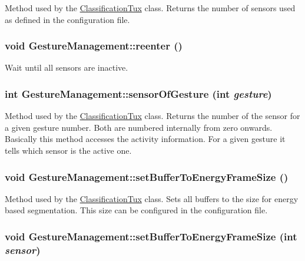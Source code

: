 \label{classGestureManagement_a97421724eb23c9b576a731ab084410da}
Method used by the \hyperlink{classClassificationTux}{ClassificationTux} class. Returns the number of sensors used as defined in the configuration file. \hypertarget{classGestureManagement_a0378e17242d054c60f7cfc21c80ba3a3}{
\subsubsection[{reenter}]{\setlength{\rightskip}{0pt plus 5cm}void GestureManagement::reenter ()}}
\label{classGestureManagement_a0378e17242d054c60f7cfc21c80ba3a3}
Wait until all sensors are inactive. \hypertarget{classGestureManagement_a820208c72d103acd4a7712e83fb89ef0}{
\subsubsection[{sensorOfGesture}]{\setlength{\rightskip}{0pt plus 5cm}int GestureManagement::sensorOfGesture (int {\em gesture})}}
\label{classGestureManagement_a820208c72d103acd4a7712e83fb89ef0}
Method used by the \hyperlink{classClassificationTux}{ClassificationTux} class. Returns the number of the sensor for a given gesture number. Both are numbered internally from zero onwards. Basically this method accesses the activity information. For a given gesture it tells which sensor is the active one. \hypertarget{classGestureManagement_ab5648ffc34fad5ab03d9c45c30d54196}{
\subsubsection[{setBufferToEnergyFrameSize}]{\setlength{\rightskip}{0pt plus 5cm}void GestureManagement::setBufferToEnergyFrameSize ()}}
\label{classGestureManagement_ab5648ffc34fad5ab03d9c45c30d54196}
Method used by the \hyperlink{classClassificationTux}{ClassificationTux} class. Sets all buffers to the size for energy based segmentation. This size can be configured in the configuration file. \hypertarget{classGestureManagement_aceff487c58b7a4e7a837b75207d6cf6e}{
\subsubsection[{setBufferToEnergyFrameSize}]{\setlength{\rightskip}{0pt plus 5cm}void GestureManagement::setBufferToEnergyFrameSize (int {\em sensor})}}
